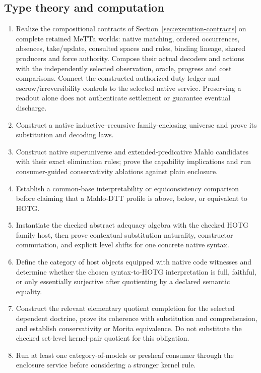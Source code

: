 \documentclass[11pt]{article}
\theoremstyle{definition}
\theoremstyle{remark}
\begin{document}
\subsection{Type theory and computation}

\begin{enumerate}
\item Realize the compositional contracts of
  Section~\ref{sec:execution-contracts} on complete retained MeTTa worlds:
  native matching, ordered occurrences, absences, take/update, consulted
  spaces and rules, binding lineage, shared producers and force authority.
  Compose their actual decoders and actions with the independently selected
  observation, oracle, progress and cost comparisons. Connect the constructed
  authorized duty ledger and escrow/irreversibility controls to the selected
  native service. Preserving a readout alone does not authenticate settlement
  or guarantee eventual discharge.
\item Construct a native inductive--recursive family-enclosing universe and
  prove its substitution and decoding laws.
\item Construct native superuniverse and extended-predicative Mahlo candidates
  with their exact elimination rules; prove the capability implications and run
  consumer-guided conservativity ablations against plain enclosure.
\item Establish a common-base interpretability or equiconsistency comparison
  before claiming that a Mahlo-DTT profile is above, below, or equivalent to
  HOTG.
\item Instantiate the checked abstract adequacy algebra with the checked HOTG
  family host, then prove contextual substitution naturality, constructor
  commutation, and explicit level shifts for one concrete native syntax.
\item Define the category of host objects equipped with native code witnesses
  and determine whether the chosen syntax-to-HOTG interpretation is full,
  faithful, or only essentially
  surjective after quotienting by a declared semantic equality.
\item Construct the relevant elementary quotient completion for the selected
  dependent doctrine, prove its coherence with substitution and comprehension,
  and establish conservativity or Morita equivalence.  Do not substitute the checked
  set-level kernel-pair quotient for this obligation.
\item Run at least one category-of-models or presheaf consumer through the
  enclosure service before considering a stronger kernel rule.

\end{enumerate}
\end{document}
